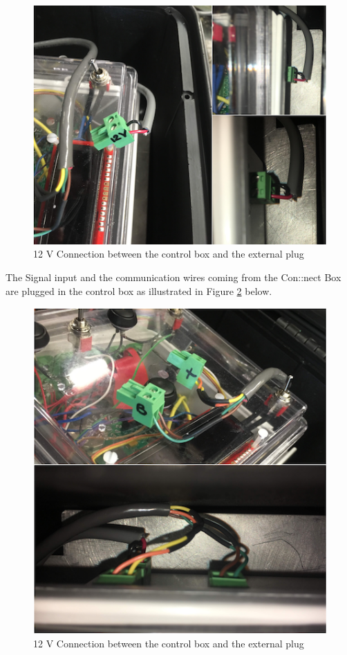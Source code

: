 \documentclass[]{book}
\begin{document}
\begin{figure}

{\centering \includegraphics[width=0.8\linewidth]{pictures/ControlBoxConnection12V} 

}

\caption{12 V Connection between the control box and the external plug}\label{fig:ControlBoxConnection12V}
\end{figure}

The Signal input and the communication wires coming from the Con::nect Box are plugged in the control box as illustrated in Figure \ref{fig:ControlBoxConnectionValveRS485} below.

\begin{figure}

{\centering \includegraphics[width=0.8\linewidth]{pictures/ControlBoxConnectionValveRS485} 

}

\caption{12 V Connection between the control box and the external plug}\label{fig:ControlBoxConnectionValveRS485}
\end{figure}
\end{document}

